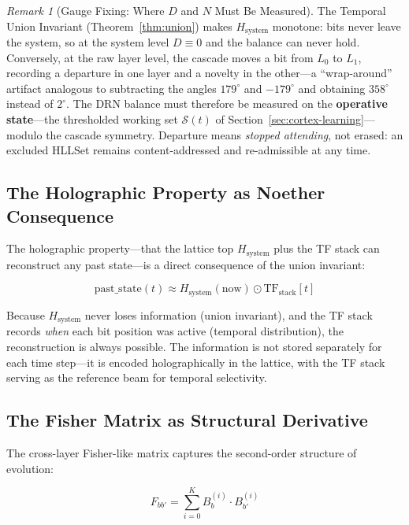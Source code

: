 \documentclass[11pt,a4paper]{article}
\theoremstyle{remark}
\newtheorem{remark}{Remark}[section]
\begin{document}
\begin{remark}[Gauge Fixing: Where $D$ and $N$ Must Be Measured]
The Temporal Union Invariant (Theorem~\ref{thm:union}) makes
$H_{\text{system}}$ monotone: bits never leave the system, so at the system
level $D \equiv 0$ and the balance can never hold. Conversely, at the raw layer
level, the cascade moves a bit from $L_0$ to $L_1$, recording a departure in one
layer and a novelty in the other---a ``wrap-around'' artifact analogous to
subtracting the angles $179^\circ$ and $-179^\circ$ and obtaining $358^\circ$
instead of $2^\circ$. The DRN balance must therefore be measured on the
\textbf{operative state}---the thresholded working set $\mathcal{S}(t)$ of
Section~\ref{sec:cortex-learning}---modulo the cascade symmetry. Departure
means \textit{stopped attending}, not erased: an excluded HLLSet remains
content-addressed and re-admissible at any time.
\end{remark}

\subsection{The Holographic Property as Noether Consequence}

The holographic property---that the lattice top $H_{\text{system}}$ plus the TF stack
can reconstruct any past state---is a direct consequence of the union invariant:

\begin{equation}
  \text{past\_state}(t) \approx H_{\text{system}}(\text{now}) \odot
  \text{TF}_{\text{stack}}[t]
\end{equation}

Because $H_{\text{system}}$ never loses information (union invariant), and the TF stack
records \textit{when} each bit position was active (temporal distribution), the
reconstruction is always possible. The information is not stored separately for each
time step---it is encoded holographically in the lattice, with the TF stack serving as
the reference beam for temporal selectivity.

\subsection{The Fisher Matrix as Structural Derivative}

The cross-layer Fisher-like matrix captures the second-order structure of evolution:

\begin{equation}
  F_{bb'} = \sum_{i=0}^{K} B^{(i)}_b \cdot B^{(i)}_{b'}
\end{equation}
\end{document}
